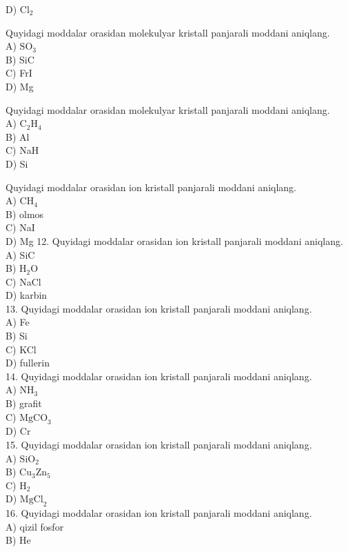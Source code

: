 D) $\mathrm{Cl}_{2}$
  \item Quyidagi moddalar orasidan molekulyar kristall panjarali moddani aniqlang.\\
A) $\mathrm{SO}_{3}$\\
B) SiC\\
C) FrI\\
D) Mg
  \item Quyidagi moddalar orasidan molekulyar kristall panjarali moddani aniqlang.\\
A) $\mathrm{C}_{2} \mathrm{H}_{4}$\\
B) Al\\
C) NaH\\
D) Si
  \item Quyidagi moddalar orasidan ion kristall panjarali moddani aniqlang.\\
A) $\mathrm{CH}_{4}$\\
B) olmos\\
C) NaI\\
D) Mg
12. Quyidagi moddalar orasidan ion kristall panjarali moddani aniqlang.\\
A) SiC\\
B) $\mathrm{H}_{2} \mathrm{O}$\\
C) NaCl\\
D) karbin\\
13. Quyidagi moddalar orasidan ion kristall panjarali moddani aniqlang.\\
A) Fe\\
B) Si\\
C) KCl\\
D) fullerin\\
14. Quyidagi moddalar orasidan ion kristall panjarali moddani aniqlang.\\
A) $\mathrm{NH}_{3}$\\
B) grafit\\
C) $\mathrm{MgCO}_{3}$\\
D) Cr\\
15. Quyidagi moddalar orasidan ion kristall panjarali moddani aniqlang.\\
A) $\mathrm{SiO}_{2}$\\
B) $\mathrm{Cu}_{3} \mathrm{Zn}_{5}$\\
C) $\mathrm{H}_{2}$\\
D) $\mathrm{MgCl}_{2}$\\
16. Quyidagi moddalar orasidan ion kristall panjarali moddani aniqlang.\\
A) qizil fosfor\\
B) He\\
